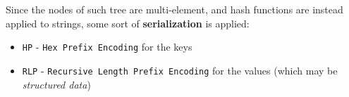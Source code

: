 {Since the nodes of such tree are multi-element, and hash functions are instead applied to strings, some sort of \textbf{serialization} is applied: \ns
\begin{itemize}
   \item \texttt{HP} - \texttt{Hex Prefix Encoding} for the keys
   \item \texttt{RLP} - \texttt{Recursive Length Prefix Encoding} for the values (which may be \textit{structured data})
\end{itemize}}

